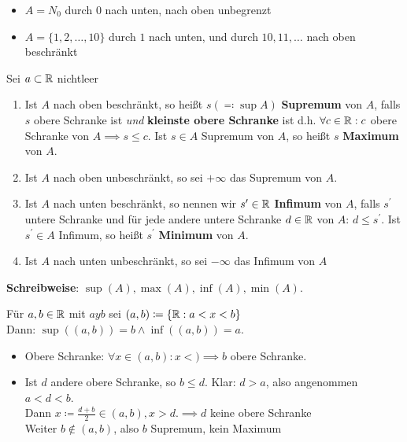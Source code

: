 \begin{subexample}
	\begin{itemize}
		\item $ A = N_0 $ durch $ 0 $ nach unten, nach oben unbegrenzt
		\item $ A = \{ 1, 2, \dotsc, 10\} $ durch $ 1 $ nach unten, und durch $ 10, 11, \dotsc $ nach oben beschränkt
	\end{itemize}
\end{subexample}

\begin{subdefinition}
	Sei $ a \subset \mathbb{R} $ nichtleer
	\begin{enumerate}[label=(\roman*)]
		\item Ist $ A $ nach oben beschränkt, so heißt $ s ( \eqqcolon \operatorname{sup}A) $ \textbf{Supremum} von $ A $, falls $ s $ obere Schranke ist \textit{und} \textbf{kleinste obere Schranke} ist d.h. $ \forall c \in \mathbb{R} : c $ obere Schranke von $ A \implies s \leq c $. Ist $ s \in A $ Supremum von $ A $, so heißt $ s $ \textbf{Maximum} von $ A $.
		\item Ist $ A $ nach oben unbeschränkt, so sei $ + \infty $ das Supremum von $ A $.
		\item Ist $ A $ nach unten beschränkt, so nennen wir $ s^\prime \in \mathbb{R} $ \textbf{Infimum} von $ A $, falls $ s^\prime$ untere Schranke und für jede andere untere Schranke $ d \in \mathbb{R} $ von $ A $: $ d \leq s^\prime $. Ist $ s^\prime \in A $ Infimum, so heißt $ s^\prime $ \textbf{Minimum} von $ A $.
		\item Ist $ A $ nach unten unbeschränkt, so sei $ - \infty $ das Infimum von $ A $
	\end{enumerate}
	\textbf{Schreibweise}: $ \sup(A), \max(A), \inf(A), \min(A)$.
\end{subdefinition}

\begin{subexample}
	Für $ a, b \in \mathbb{R} $ mit $ a y b $ sei $ ( a, b ) \coloneqq \{ \mathbb{R} : a < x < b \} $\\
	Dann: $ \sup((a,b)) = b \wedge \inf((a,b)) = a $.
	\begin{itemize}
		\item Obere Schranke: $ \forall x \in (a,b) : x <  ) \implies b $ obere Schranke.
		\item Ist $ d $ andere obere Schranke, so $ b \leq d $. Klar: $ d > a $, also angenommen $ a < d < b $.\\
			Dann $ x \coloneqq \frac{d+b}{2} \in ( a, b), x > d. \implies d $ keine obere Schranke \Lightning\\
			Weiter $ b \notin (a, b) $, also $ b $ Supremum, kein Maximum
	\end{itemize}
\end{subexample}

